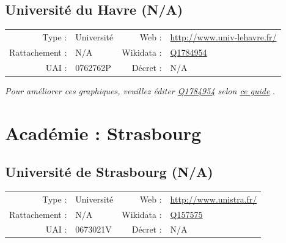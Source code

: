 \documentclass[12pt,french,landscape]{article}
\begin{document}

\newpage

\hypertarget{universituxe9-du-havre-na}{%
\subsection{Université du Havre (N/A)}\label{universituxe9-du-havre-na}}

\begin{tabular*}{0.45\textwidth}{rp{2cm}rl}  
\hline  
Type : & Université & Web : &\href{http://www.univ-lehavre.fr/}{http://www.univ-lehavre.fr/} \\  
Rattachement : & N/A & Wikidata : & \href{https://www.wikidata.org/entity/Q1784954}{Q1784954} \\  
UAI : & 0762762P & Décret : & N/A \\  
\hline  
\end{tabular*}

\textit{\scriptsize Pour améliorer ces graphiques, veuillez éditer \href{https://www.wikidata.org/entity/Q1784954}{Q1784954}  selon \href{https://github.com/cpesr/wikidataESR/blob/master/Rmd/wikidataESR.md}{ce guide}}
.


\newpage

\hypertarget{acaduxe9mie-strasbourg}{%
\section{Académie : Strasbourg}\label{acaduxe9mie-strasbourg}}

\hypertarget{universituxe9-de-strasbourg-na}{%
\subsection{Université de Strasbourg
(N/A)}\label{universituxe9-de-strasbourg-na}}

\begin{tabular*}{0.45\textwidth}{rp{2cm}rl}  
\hline  
Type : & Université & Web : &\href{http://www.unistra.fr/}{http://www.unistra.fr/} \\  
Rattachement : & N/A & Wikidata : & \href{https://www.wikidata.org/entity/Q157575}{Q157575} \\  
UAI : & 0673021V & Décret : & N/A \\  
\hline  
\end{tabular*}
\end{document}
